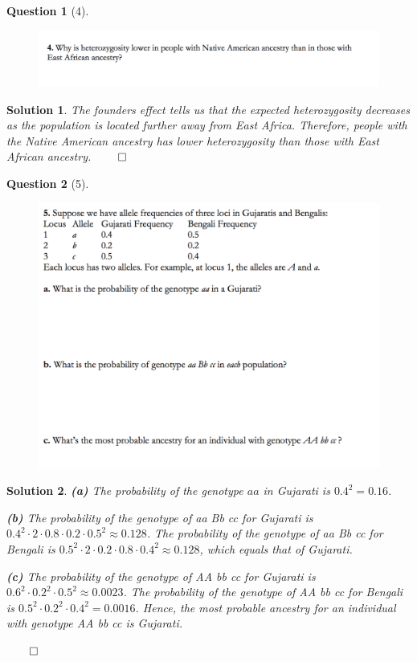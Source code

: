 \documentclass{article} %
\theoremstyle{quest}
\newtheorem*{question}{Question}
\newtheorem*{solution}{Solution}
\begin{document}
\begin{question}[4]
\hfill
\begin{figure}[h!]
  \centering
    \includegraphics[width=1\textwidth]{genetics-9-4.png}
\end{figure}
\end{question}
\begin{solution}
The founders effect tells us that the expected heterozygosity 
decreases as the population is located further away from East
Africa. Therefore, people with the Native American ancestry 
has lower heterozygosity than those with East African ancestry. 
\hfill $\qed$ 
\end{solution}

\newpage

\begin{question}[5]
\hfill
\begin{figure}[h!]
  \centering
    \includegraphics[width=1\textwidth]{genetics-9-5.png}
\end{figure}
\end{question}
\begin{solution}
\textbf{(a)} The probability of the genotype $aa$ in Gujarati is
$0.4^2 = 0.16$.

\smallskip

\textbf{(b)} The probability of the genotype of aa Bb cc for Gujarati is
$0.4^2 \cdot 2\cdot 0.8 \cdot 0.2 \cdot 0.5^2 \approx 0.128$.
The probability of the genotype of aa Bb cc for Bengali is
$0.5^2 \cdot 2 \cdot 0.2 \cdot 0.8 \cdot 0.4^2 \approx 0.128 $, which equals
that of Gujarati. 
 
\smallskip

\textbf{(c)} The probability of the genotype of AA bb cc for
Gujarati is $0.6^2 \cdot 0.2^2 \cdot 0.5^2 \approx 0.0023$. The probability
of the genotype of AA bb cc for Bengali is $0.5^2 \cdot 0.2^2 \cdot 0.4^2
= 0.0016$. Hence, the most probable ancestry for an individual with
genotype AA bb cc is Gujarati. 

\hfill $\qed$

\end{solution} 
\end{document}

